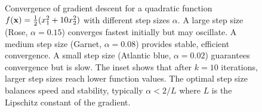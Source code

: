 \begin{figure}[htbp]
\begin{tikzpicture}
\end{tikzpicture}
\caption{Convergence of gradient descent for a quadratic function $f(\mathbf{x}) = \frac{1}{2}(x_1^2 + 10x_2^2)$ with different step sizes $\alpha$. A large step size (Rose, $\alpha = 0.15$) converges fastest initially but may oscillate. A medium step size (Garnet, $\alpha = 0.08$) provides stable, efficient convergence. A small step size (Atlantic blue, $\alpha = 0.02$) guarantees convergence but is slow. The inset shows that after $k=10$ iterations, larger step sizes reach lower function values. The optimal step size balances speed and stability, typically $\alpha < 2/L$ where $L$ is the Lipschitz constant of the gradient.}
\label{fig:gradient_descent}
\end{figure}

